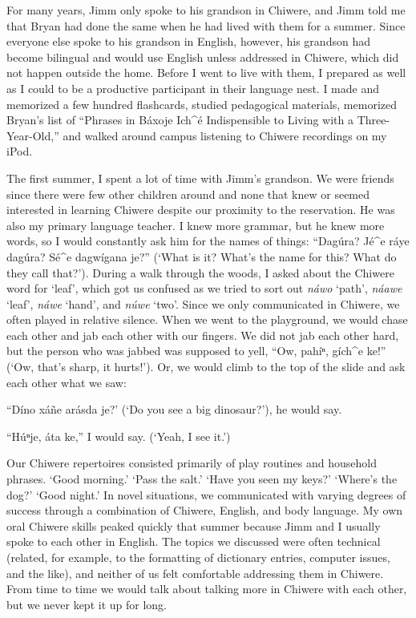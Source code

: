 \documentclass[output=paper]{LSP/langsci}
\begin{document}
For many years, Jimm only spoke to his grandson in Chiwere, and Jimm told me that Bryan had done the same when he had lived with them for a summer. Since everyone else spoke to his grandson in English, however, his grandson had become bilingual and would use English unless addressed in Chiwere, which did not happen outside the home. Before I went to live with them, I prepared as well as I could to be a productive participant in their language nest. I made and memorized a few hundred flashcards, studied pedagogical materials, memorized Bryan's list of ``Phrases in B\'axoje Ich\^{ }\'e Indispensible to Living with a Three-Year-Old,'' and walked around campus listening to Chiwere recordings on my iPod.

The first summer, I spent a lot of time with Jimm's grandson. We were friends since there were few other children around and none that knew or seemed interested in learning Chiwere despite our proximity to the reservation. He was also my primary language teacher. I knew more grammar, but he knew more words, so I would constantly ask him for the names of things: ``Dag\'ura? J\'e\^{ }e r\'aye dag\'ura? S\'e\^{ }e dagw\'igana je?'' (`What is it? What's the name for this? What do they call that?'). During a walk through the woods, I asked about the Chiwere word for `leaf', which got us confused as we tried to sort out \emph{n\'awo} `path', \emph{n\'aawe} `leaf', \emph{n\'awe} `hand', and \emph{n\'uwe} `two'. Since we only communicated in Chiwere, we often played in relative silence. When we went to the playground, we would chase each other and jab each other with our fingers. We did not jab each other hard, but the person who was jabbed was supposed to yell, ``Ow, pah\'iⁿ, g\'ich\^{ }e ke!'' (`Ow, that's sharp, it hurts!'). Or, we would climb to the top of the slide and ask each other what we saw:

	``D\'ino x\'a\~ne ar\'asda je?' (`Do you see a big dinosaur?'), he would say.
	
	``H\'uⁿje, \'ata ke,'' I would say. (`Yeah, I see it.')

Our Chiwere repertoires consisted primarily of play routines and household phrases. `Good morning.' `Pass the salt.' `Have you seen my keys?' `Where's the dog?' `Good night.' In novel situations, we communicated with varying degrees of success through a combination of Chiwere, English, and body language. My own oral Chiwere skills peaked quickly that summer because Jimm and I usually spoke to each other in English. The topics we discussed were often technical (related, for example, to the formatting of dictionary entries, computer issues, and the like), and neither of us felt comfortable addressing them in Chiwere. From time to time we would talk about talking more in Chiwere with each other, but we never kept it up for long.
\end{document}
